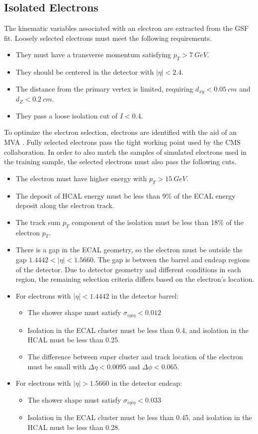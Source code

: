 \subsection{Isolated Electrons} \label{sec:ele-def}

The kinematic variables associated with an electron are extracted from the GSF fit.
Loosely selected electrons must meet the following requirements.
\begin{itemize}
\item They must have a transverse momentum satisfying $p_T > \SI{7}{GeV}$.
\item They should be centered in the detector with $|\eta| < 2.4$.
\item The distance from the primary vertex is limited, requiring
  $d_{xy} < \SI{0.05}{cm}$ and $d_Z < \SI{0.2}{cm}$.
\item They pass a loose isolation cut of $I < 0.4$.
\end{itemize}
To optimize the electron selection,
electrons are identified with the aid of an MVA \cite{Rembser_2019}.
Fully selected electrons pass the tight working point used by the CMS collaboration.
In order to also match the samples of simulated electrons used in the training sample,
the selected electrons must also pass the following cuts.
\begin{itemize}
\item The electron must have higher energy with $p_T > \SI{15}{GeV}$.
\item The deposit of HCAL energy must be less than 9\% of the ECAL energy deposit
  along the electron track.
\item The track sum $p_T$ component of the isolation must be
  less than 18\% of the electron $p_T$.
\item There is a gap in the ECAL geometry,
  so the electron must be outside the gap $1.4442 < |\eta| < 1.5660$.
  The gap is between the barrel and endcap regions of the detector.
  Due to detector geometry and different conditions in each region,
  the remaining selection criteria differs based on the electron's location.
\item For electrons with $|\eta| < 1.4442$ in the detector barrel:
  \begin{itemize}
  \item The shower shape must satisfy $\sigma_{i\eta i\eta} < 0.012$
  \item Isolation in the ECAL cluster must be less than 0.4,
    and isolation in the HCAL must be less than 0.25.
  \item The difference between super cluster and track location of the electron
    must be small with $\Delta \eta < 0.0095$ and $\Delta \phi < 0.065$.
  \end{itemize}
\item For electrons with $|\eta| > 1.5660$ in the detector endcap:
  \begin{itemize}
  \item The shower shape must satisfy $\sigma_{i\eta i\eta} < 0.033$
  \item Isolation in the ECAL cluster must be less than 0.45,
    and isolation in the HCAL must be less than 0.28.
  \end{itemize}
\end{itemize}

